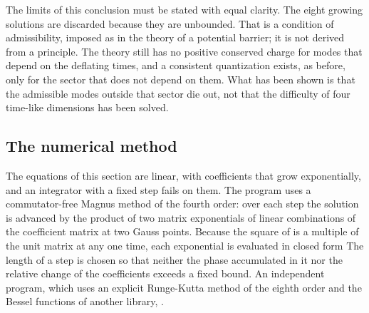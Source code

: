 The limits of this conclusion must be stated with equal clarity. The eight growing solutions are
discarded because they are unbounded. That is a condition of admissibility, imposed as in the theory
of a potential barrier; it is not derived from a principle. The theory still has no positive
conserved charge for modes that depend on the deflating times, and a consistent quantization exists,
as before, only for the sector that does not depend on them. What has been shown is that the
admissible modes outside that sector die out, not that the difficulty of four time-like dimensions
has been solved.

\subsection{The numerical method}

The equations of this section are linear, with coefficients that grow exponentially, and an
integrator with a fixed step fails on them. The program uses a commutator-free Magnus method of the
fourth order: over each step the solution is advanced by the product of two matrix exponentials of
linear combinations of the coefficient matrix at two Gauss points. Because the square of
 is a multiple of the unit matrix at any one time, each exponential is evaluated in
closed form The length of a step is chosen so that
neither the phase accumulated in it nor the relative change of the coefficients exceeds a fixed
bound. An independent program,
which uses an explicit Runge-Kutta method of the eighth order and the Bessel functions of another
library,  \cite{DeflationRepo}.

